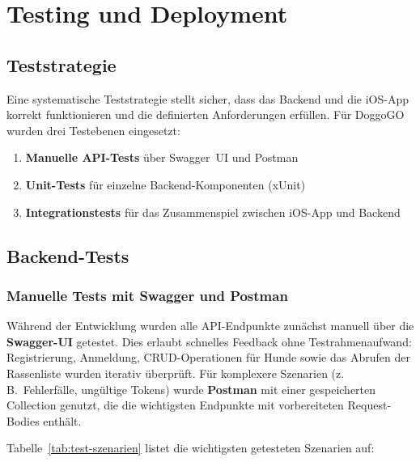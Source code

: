 \chapter{Testing und Deployment}
\label{chap:testing}

\section{Teststrategie}
\label{sec:teststrategie}

Eine systematische Teststrategie stellt sicher, dass das Backend und die iOS-App korrekt
funktionieren und die definierten Anforderungen erfüllen. Für DoggoGO wurden drei
Testebenen eingesetzt:

\begin{enumerate}
  \item \textbf{Manuelle API-Tests} über Swagger~UI und Postman
  \item \textbf{Unit-Tests} für einzelne Backend-Komponenten (xUnit)
  \item \textbf{Integrationstests} für das Zusammenspiel zwischen iOS-App und Backend
\end{enumerate}

\section{Backend-Tests}
\label{sec:backend-tests}

\subsection{Manuelle Tests mit Swagger und Postman}
\label{subsec:swagger-tests}

Während der Entwicklung wurden alle API-Endpunkte zunächst manuell über die
\textbf{Swagger-UI} getestet. Dies erlaubt schnelles Feedback ohne Testrahmenaufwand:
Registrierung, Anmeldung, CRUD-Operationen für Hunde sowie das Abrufen der Rassenliste
wurden iterativ überprüft. Für komplexere Szenarien (z.\,B.\ Fehlerfälle, ungültige Tokens)
wurde \textbf{Postman} mit einer gespeicherten Collection genutzt, die die wichtigsten
Endpunkte mit vorbereiteten Request-Bodies enthält.

Tabelle~\ref{tab:test-szenarien} listet die wichtigsten getesteten Szenarien auf:

